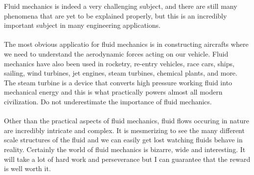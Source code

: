 Fluid mechanics is indeed a very challenging subject, and there are still many phenomena that are yet to be explained properly, but this is an incredibly important subject in many engineering applications.
\\~\\The most obvious applicatio for fluid mechanics is in constructing aircrafts where we need to understand the aerodynamic forces acting on our vehicle.
Fluid mechanics have also been used in rocketry, re-entry vehicles, race cars, ships, sailing, wind turbines, jet engines, steam turbines, chemical plants, and more.
The steam turbine is a device that converts high pressure working fluid into mechanical energy and this is what practically powers almost all modern civilization. 
Do not underestimate the importance of fluid mechanics.
\\~\\Other than the practical aspects of fluid mechanics, fluid flows occuring in nature are incredibly intricate and complex. 
It is mesmerizing to see the many different scale structures of the fluid and we can easily get lost watching fluids behave in reality.
Certainly the world of fluid mechanics is bizarre, wide and interesting.
It will take a lot of hard work and perseverance but I can guarantee that the reward is well worth it.

